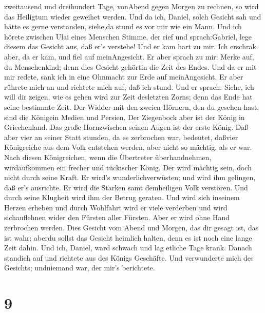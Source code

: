 zweitausend und dreihundert Tage, vonAbend gegen Morgen zu rechnen, so
wird das Heiligtum wieder geweihet werden.  Und da ich,
Daniel, solch Gesicht sah und hätte es gerne verstanden, siehe,da stund
es vor mir wie ein Mann.  Und ich hörete zwischen Ulai
eines Menschen Stimme, der rief und sprach:Gabriel, lege diesem das
Gesicht aus, daß er's verstehe!  Und er kam hart zu mir.
Ich erschrak aber, da er kam, und fiel auf meinAngesicht. Er aber sprach
zu mir: Merke auf, du Menschenkind; denn dies Gesicht gehörtin die Zeit
des Endes.  Und da er mit mir redete, sank ich in eine
Ohnmacht zur Erde auf meinAngesicht. Er aber rührete mich an und
richtete mich auf, daß ich stund.  Und er sprach: Siehe,
ich will dir zeigen, wie es gehen wird zur Zeit desletzten Zorns; denn
das Ende hat seine bestimmte Zeit.  Der Widder mit den
zweien Hörnern, den du gesehen hast, sind die Königein Medien und
Persien.  Der Ziegenbock aber ist der König in
Griechenland. Das große Hornzwischen seinen Augen ist der erste König.
 Daß aber vier an seiner Statt stunden, da es zerbrochen
war, bedeutet, daßvier Königreiche aus dem Volk entstehen werden, aber
nicht so mächtig, als er war.  Nach diesen Königreichen,
wenn die Übertreter überhandnehmen, wirdaufkommen ein frecher und
tückischer König.  Der wird mächtig sein, doch nicht durch
seine Kraft. Er wird's wunderlichverwüsten; und wird ihm gelingen, daß
er's ausrichte. Er wird die Starken samt demheiligen Volk verstören.
 Und durch seine Klugheit wird ihm der Betrug geraten. Und
wird sich inseinem Herzen erheben und durch Wohlfahrt wird er viele
verderben und wird sichauflehnen wider den Fürsten aller Fürsten. Aber
er wird ohne Hand zerbrochen werden.  Dies Gesicht vom
Abend und Morgen, das dir gesagt ist, das ist wahr; aberdu sollst das
Gesicht heimlich halten, denn es ist noch eine lange Zeit dahin.
 Und ich, Daniel, ward schwach und lag etliche Tage krank.
Danach standich auf und richtete aus des Königs Geschäfte. Und
verwunderte mich des Gesichts; undniemand war, der mir's berichtete.

\hypertarget{section-8}{%
\section{9}\label{section-8}}

